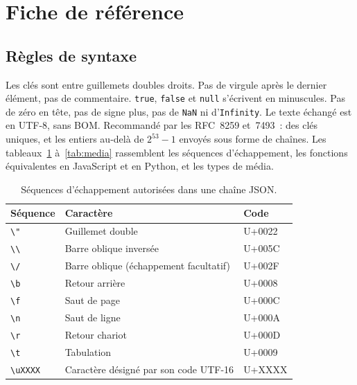 \documentclass[12pt,a4paper]{article}
\begin{document}
\section{Fiche de référence}
\label{sec:fiche}

\subsection{Règles de syntaxe}
Les clés sont entre guillemets doubles droits. Pas de virgule après le dernier élément, pas de commentaire. \texttt{true}, \texttt{false} et \texttt{null} s'écrivent en minuscules. Pas de zéro en tête, pas de signe plus, pas de \texttt{NaN} ni d'\texttt{Infinity}. Le texte échangé est en UTF-8, sans BOM. Recommandé par les RFC~8259 et~7493~: des clés uniques, et les entiers au-delà de $2^{53}-1$ envoyés sous forme de chaînes. Les tableaux~\ref{tab:echappements} à~\ref{tab:media} rassemblent les séquences d'échappement, les fonctions équivalentes en JavaScript et en Python, et les types de média.

\begin{table}[H]
\centering
\footnotesize
\begin{tabular}{lll}
\toprule
\textbf{Séquence} & \textbf{Caractère} & \textbf{Code} \\
\midrule
\texttt{\textbackslash"} & Guillemet double & U+0022 \\
\texttt{\textbackslash\textbackslash} & Barre oblique inversée & U+005C \\
\texttt{\textbackslash/} & Barre oblique (échappement facultatif) & U+002F \\
\texttt{\textbackslash b} & Retour arrière & U+0008 \\
\texttt{\textbackslash f} & Saut de page & U+000C \\
\texttt{\textbackslash n} & Saut de ligne & U+000A \\
\texttt{\textbackslash r} & Retour chariot & U+000D \\
\texttt{\textbackslash t} & Tabulation & U+0009 \\
\texttt{\textbackslash uXXXX} & Caractère désigné par son code UTF-16 & U+XXXX \\
\bottomrule
\end{tabular}
\caption{Séquences d'échappement autorisées dans une chaîne JSON.}
\label{tab:echappements}
\end{table}
\end{document}
